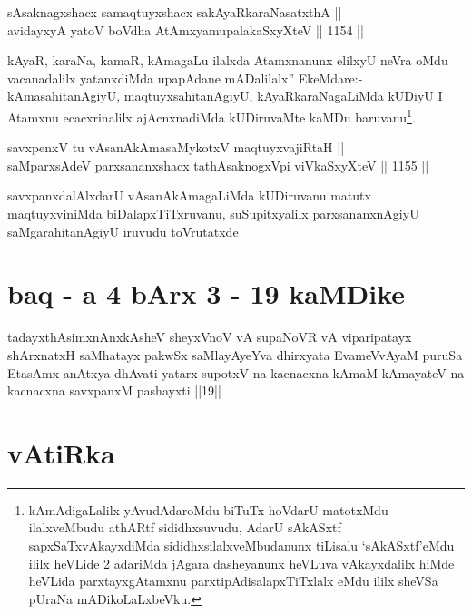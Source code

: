 \begin{shl}
sAsaknagxshacx samaqtuyxshacx sakAyaRkaraNasatxthA || \\
avidayxyA yatoV boVdha AtAmx\s yamupalakaSxyXteV ||  1154 ||  
\end{shl}

\begin{artha}
kAyaR, karaNa, kamaR, kAmagaLu ilalxda Atamxnanunx elilxyU neVra oMdu vacanadalilx yatanxdiMda upapAdane mADalilalx'' EkeMdare:- kAmasahitanAgiyU, maqtuyxsahitanAgiyU, kAyaRkaraNagaLiMda kUDiyU I Atamxnu ecacxrinalilx ajAcnxnadiMda kUDiruvaMte kaMDu baruvanu\footnote{kAmAdigaLalilx yAvudAdaroMdu biTuTx hoVdarU matotxMdu ilalxveMbudu athARtf sididhxsuvudu, AdarU sAkASxtf sapxSaTxvAkayxdiMda sididhxsilalxveMbudanunx tiLisalu `sAkASxtf'eMdu ililx heVLide 2 adariMda jAgara dasheyanunx heVLuva vAkayxdalilx hiMde heVLida parxtayxgAtamxnu parxtipAdisalapxTiTxlalx eMdu ililx sheVSa pUraNa mADikoLaLxbeVku.}.
\end{artha}


\begin{shl}
savxpenxV tu vAsanAkAmasaMykotxV maqtuyxvajiRtaH || \\
saMparxsAdeV parxsananxshacx tathA\s saknogxV\s pi viVkaSxyXteV ||  1155 ||  
\end{shl}

\begin{artha}
savxpanxdalAlxdarU vAsanAkAmagaLiMda kUDiruvanu matutx maqtuyxviniMda biDalapxTiTxruvanu, suSupitxyalilx parxsananxnAgiyU saMgarahitanAgiyU iruvudu toVrutatxde
\end{artha}

\section*{baq - a 4 bArx 3 - 19 kaMDike}

\begin{shl}
tadayxthAsimxnAnxkAsheV sheyxVnoV vA supaNoVR vA viparipatayx shArxnatxH saMhatayx pakwSx saMlayAyeYva dhirxyata EvameVvAyaM puruSa EtasAmx anAtxya dhAvati yatarx supotxV na kacnacxna kAmaM kAmayateV na kacnacxna savxpanxM pashayxti ||19||
\end{shl}

\section*{vAtiRka}

